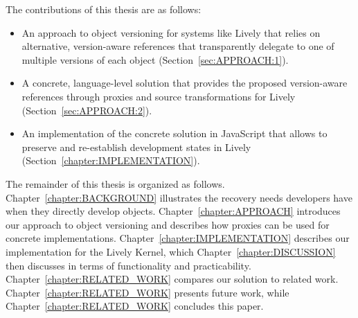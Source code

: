 The contributions of this thesis are as follows:
\begin{itemize}
    \item An approach to object versioning for systems like Lively that relies on alternative, version-aware references that transparently delegate to one of multiple versions of each object (Section~\ref{sec:APPROACH:1}).
    \item A concrete, language-level solution that provides the proposed version-aware references through proxies and source transformations for Lively (Section~\ref{sec:APPROACH:2}).
    \item An implementation of the concrete solution in JavaScript that allows to preserve and re-establish development states in Lively (Section~\ref{chapter:IMPLEMENTATION}).\\
\end{itemize}

The remainder of this thesis is organized as follows. 
Chapter~\ref{chapter:BACKGROUND} illustrates the recovery needs developers have when they directly develop objects.
Chapter~\ref{chapter:APPROACH} introduces our approach to object versioning and describes how proxies can be used for concrete implementations.
Chapter~\ref{chapter:IMPLEMENTATION} describes our implementation for the Lively Kernel, which Chapter~\ref{chapter:DISCUSSION} then discusses in terms of functionality and practicability.
Chapter~\ref{chapter:RELATED_WORK} compares our solution to related work.
Chapter~\ref{chapter:RELATED_WORK} presents future work, while Chapter~\ref{chapter:RELATED_WORK} concludes this paper.
